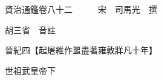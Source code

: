 










 


 
 


 

  
  
  
  
  





  
  
  
  
  
 
  

  

  
  
  



  

 
 

  
   




  

  
  


  　　資治通鑑卷八十二　　　宋　司馬光　撰

　　胡三省　音註

　　晉紀四【起屠維作噩盡著雍敦牂凡十年】

　　世祖武皇帝下

